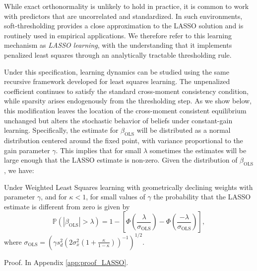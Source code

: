 \documentclass[11pt]{article}
\begin{document}
While exact orthonormality is unlikely to hold in practice, it is common to work with predictors that are uncorrelated and standardized. In such environments, soft-thresholding provides a close approximation to the LASSO solution and is routinely used in empirical applications. We therefore refer to this learning mechanism as \emph{LASSO learning}, with the understanding that it implements penalized least squares through an analytically tractable thresholding rule.

Under this specification, learning dynamics can be studied using the same recursive framework developed for least squares learning. The unpenalized coefficient continues to satisfy the standard cross-moment consistency condition, while sparsity arises endogenously from the thresholding step. As we show below, this modification leaves the location of the cross-moment consistent equilibrium unchanged but alters the stochastic behavior of beliefs under constant-gain learning.
Specifically, the estimate for $\beta_{\text{OLS}}$ will be distributed as a normal distribution centered around the fixed point, with variance proportional to the gain parameter $\gamma$. 
This implies that for small $\lambda$ sometimes the estimates will be large enough that the LASSO estimate is non-zero. 
Given the distribution of $\beta_{\text{OLS}}$, we have: 
\begin{proposition}\label{prop:LASSO_estimate}
     Under Weighted Least Squares learning with geometrically declining weights with parameter $\gamma$, and for $\kappa < 1$, for small values of $\gamma$ the probability that the LASSO estimate is different from zero is given by 
     \begin{equation} \mathbb{P}(|{\beta}_{\text{OLS}}| > \lambda) = 1 - \left[\Phi\left(\frac{\lambda}{\sigma_{\text{OLS}}}\right) - \Phi\left(\frac{-\lambda}{\sigma_{\text{OLS}}}\right)\right], \end{equation} where $\sigma_{\text{OLS}} = \left(\gamma s_{d}^2 \left(2 \sigma^2_x \left(1 + \frac{\kappa}{1 - \kappa} \right)\right)^{-1}\right)^{1/2}$.
\end{proposition}

Proof. In Appendix \ref{app:proof_LASSO}.
\end{document}
